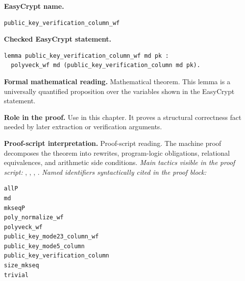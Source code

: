 \begin{formaltheorem}
\noindent\textbf{EasyCrypt name.}
\begin{lstlisting}[language=EasyCrypt,basicstyle=\ttfamily\scriptsize]
public_key_verification_column_wf
\end{lstlisting}
\noindent\textbf{Checked EasyCrypt statement.}
\begin{lstlisting}[language=EasyCrypt,basicstyle=\ttfamily\scriptsize]
lemma public_key_verification_column_wf md pk :
  polyveck_wf md (public_key_verification_column md pk).
\end{lstlisting}
\noindent\textbf{Formal mathematical reading.}
Mathematical theorem. This lemma is a universally quantified proposition over the variables shown in the EasyCrypt statement.

\noindent\textbf{Role in the proof.}
Use in this chapter. It proves a structural correctness fact needed by later extraction or verification arguments.

\noindent\textbf{Proof-script interpretation.}
Proof-script reading. The machine proof decomposes the theorem into rewrites, program-logic obligations, relational equivalences, and arithmetic side conditions.
\emph{Main tactics visible in the proof script:} , , , .
\emph{Named identifiers syntactically cited in the proof block:}
\begin{lstlisting}[language=EasyCrypt,basicstyle=\ttfamily\scriptsize]
allP
md
mkseqP
poly_normalize_wf
polyveck_wf
public_key_mode23_column_wf
public_key_mode5_column
public_key_verification_column
size_mkseq
trivial
\end{lstlisting}

\end{formaltheorem}

